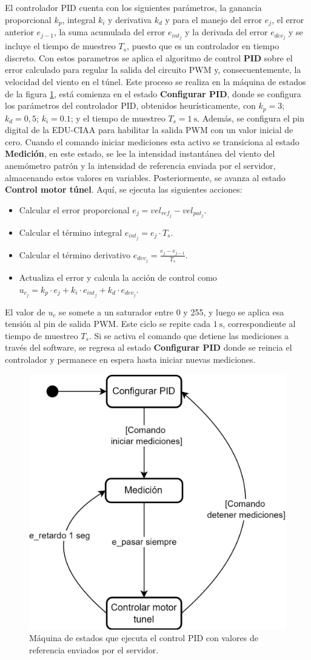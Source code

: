 El controlador PID cuenta con los siguientes parámetros, la ganancia proporcional $k_{p}$, integral $k_{i}$ y derivativa $k_{d}$ y para el manejo del error $e_{j}$, el error anterior $e_{j-1}$, la suma acumulada del error $e_{int_{j}}$ y la derivada del error $e_{dev_{j}}$ y se incluye el tiempo de muestreo $T_{s}$, puesto que es un controlador en tiempo discreto. Con estos parametros se aplica el algoritmo de control \textbf{PID} sobre el error calculado para regular la salida del circuito PWM y, consecuentemente, la velocidad del viento en el túnel. Este proceso se realiza en la máquina de estados de la figura \ref{fig:sc_controlTunnel}, está comienza en el estado \textbf{Configurar PID}, donde se configura los parámetros del controlador PID, obtenidos heurísticamente, con $k_{p} = 3$; $k_{d} = 0,5$; $k_{i} = 0.1$; y el tiempo de muestreo $T_{s} = \SI{1}{\second}$. Además, se configura el pin digital de la EDU-CIAA para habilitar la salida PWM con un valor inicial de cero. Cuando el comando iniciar mediciones esta activo se transiciona al estado \textbf{Medición}, en este estado, se lee la intensidad instantánea del viento del anemómetro patrón y la intensidad de referencia enviada por el servidor, almacenando estos valores en variables. Posteriormente, se avanza al estado \textbf{Control motor túnel}. Aquí, se ejecuta las siguientes acciones:
\begin{itemize}
    \item Calcular el error proporcional $e_{j} = vel_{ref_{j}} - vel_{pat_{j}}$.
    \item Calcular el término integral $e_{int_{j}} = e_{j} \cdot T_{s}$.
    \item Calcular el término derivativo $e_{dev_{j}} = \frac{e_{j} - e_{j-1}}{T_{s}}$.
    \item Actualiza el error y calcula la acción de control como $u_{c_{j}} = k_{p} \cdot e_{j} + k_{i} \cdot e_{int_{j}} + k_{d} \cdot e_{dev_{j}}$.
\end{itemize}
El valor de $u_{c}$ se somete a un saturador entre 0 y 255, y luego se aplica esa tensión al pin de salida PWM. Este ciclo se repite cada $\SI{1}{\second}$, correspondiente al tiempo de muestreo $T_{s}$. Si se activa el comando que detiene las mediciones a través del software, se regresa al estado \textbf{Configurar PID} donde se reincia el controlador y permanece en espera hasta iniciar nuevas mediciones.

\begin{figure}[H]
    \centering
    \includegraphics[width=0.6\linewidth]{Figuras/datalogger/Firmware/sc_controlTunnel.png}
    \caption{Máquina de estados que ejecuta el control PID con valores de referencia enviados por el servidor.}
    \label{fig:sc_controlTunnel}
\end{figure}
